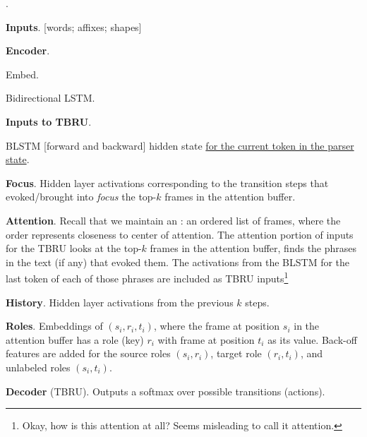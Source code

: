 \documentclass[11pt]{article}
\newcommand\p{\Needspace{10\baselineskip} \noindent}
\begin{document}
\p {}. 
\begin{compactitem}
	\item \textbf{Inputs}. [words; affixes; shapes]
	
	\item \textbf{Encoder}. 
	\begin{compactenum}
		\item Embed.
		\item Bidirectional LSTM. 
	\end{compactenum}
	
	\item \textbf{Inputs to TBRU}.
	\begin{compactitem}
			\item BLSTM [forward and backward] hidden state \underline{for the current token in the parser state}.
			
			\item \textbf{Focus}. Hidden layer activations corresponding to the transition steps that evoked/brought into \textit{focus} the top-$k$ frames in the attention buffer.
			
			\item \textbf{Attention}. Recall that we maintain an : an ordered list of frames, where the order represents closeness to center of attention. The attention portion of inputs for the TBRU looks at the top-$k$ frames in the attention buffer, finds the phrases in the text (if any) that evoked them. The activations from the BLSTM for the last token of each of those phrases are included as TBRU inputs\footnote{Okay, how is this attention at all? Seems misleading to call it attention.}

			\item \textbf{History}. Hidden layer activations from the previous $k$ steps.
			
			\item \textbf{Roles}. Embeddings of $(s_i, r_i, t_i)$, where the frame at position $s_i$ in the attention buffer has a role (key) $r_i$ with frame at position $t_i$ as its value. Back-off features are added for the source roles $(s_i, r_i)$, target role $(r_i, t_i)$, and unlabeled roles $(s_i, t_i)$. 
	\end{compactitem}
	
	\item \textbf{Decoder} (TBRU). Outputs a softmax over possible transitions (actions). 
\end{compactitem}
\end{document}
